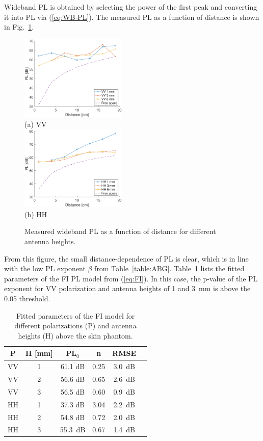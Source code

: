 \documentclass[preprint]{rsl}
\begin{document}
Wideband PL is obtained by selecting the power of the first peak and converting it into PL via (\ref{eq:WB-PL}). 
The measured PL as a function of distance is shown in Fig.~\ref{fig:PL_vs_dist}. 
\begin{figure}[tb]
\begin{center}
	\includegraphics[width=0.45\textwidth]{figures/PL_vs_dist_VV}
	\\
	(a) VV
	\\
	\includegraphics[width=0.45\textwidth]{figures/PL_vs_dist_HH}
	\\
	(b) HH
\caption{Measured wideband PL as a function of distance for different antenna heights.}
\label{fig:PL_vs_dist}
\end{center}
\end{figure}
From this figure, the small distance-dependence of PL is clear, which is in line with the low PL exponent $\beta$ from Table~\ref{table:ABG}.
Table~\ref{table:FI} lists the fitted parameters of the FI PL model from (\ref{eq:FI}).
In this case, the p-value of the PL exponent for VV polarization and antenna heights of 1 and 3~mm is above the 0.05 threshold.
\begin{table}[tb]
  \caption{Fitted parameters of the FI model for different polarizations (P) and antenna heights (H) above the skin phantom.}
  \label{table:FI}
  \begin{center}
    \begin{tabular}{cc|cccc}
      P & H [mm] & PL$_0$ & n& RMSE \\
      \hline
      VV & 1 & 61.1 dB & 0.25 & 3.0~dB \\
      VV & 2 & 56.6 dB & 0.65 & 2.6~dB \\
      VV & 3 & 56.5 dB & 0.60 & 0.9~dB \\
      HH & 1 & 37.3 dB & 3.04 & 2.2~dB \\
      HH & 2 & 54.8 dB & 0.72 & 2.0~dB \\
      HH & 3 & 55.3~dB & 0.67 & 1.4~dB \\
    \end{tabular}
  \end{center}
\end{table}
\end{document}
